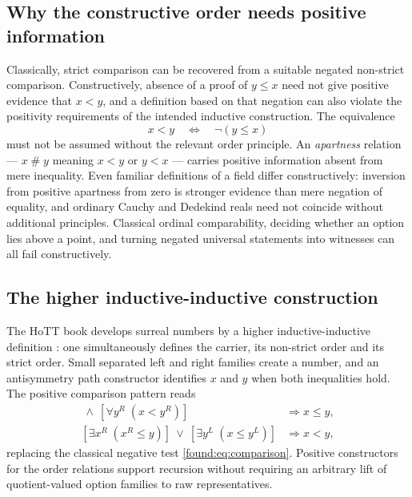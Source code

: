 \documentclass[11pt,letterpaper]{article}
\numberwithin{equation}{section}
\theoremstyle{definition}
\theoremstyle{remark}
\begin{document}
\subsection{Why the constructive order needs positive information}
\label{found:sub:apartness}
Classically, strict comparison can be recovered from a suitable negated
non-strict comparison. Constructively, absence of a proof of $y\le x$ need not
give positive evidence that $x<y$, and a definition based on that negation can
also violate the positivity requirements of the intended inductive
construction. The equivalence
\[
 x<y\quad\Longleftrightarrow\quad\neg(y\le x)
\]
must not be assumed without the relevant order principle. An \emph{apartness}
relation --- $x\mathrel{\#}y$ meaning $x<y$ or $y<x$ --- carries positive
information absent from mere inequality. Even familiar definitions of a field
differ constructively: inversion from positive apartness from zero is stronger
evidence than mere negation of equality, and ordinary Cauchy and Dedekind reals
need not coincide without additional principles. Classical ordinal
comparability, deciding whether an option lies above a point, and turning
negated universal statements into witnesses can all fail constructively.

\subsection{The higher inductive-inductive construction}
\label{found:sub:hiit}
The HoTT book develops surreal numbers by a higher inductive-inductive
definition \cite[\S11.6]{found:HoTTBook}: one simultaneously defines the
carrier, its non-strict order and its strict order. Small separated left and
right families create a number, and an antisymmetry path constructor identifies
$x$ and $y$ when both inequalities hold. The positive comparison pattern reads
\begin{align*}
 [\forall x^L\;(x^L<y)]\ \land\ [\forall y^R\;(x<y^R)]&\Longrightarrow x\le y,\\
 [\exists x^R\;(x^R\le y)]\ \lor\ [\exists y^L\;(x\le y^L)]&\Longrightarrow x<y,
\end{align*}
replacing the classical negative test \eqref{found:eq:comparison}. Positive
constructors for the order relations support recursion without requiring an
arbitrary lift of quotient-valued option families to raw representatives.
\end{document}
